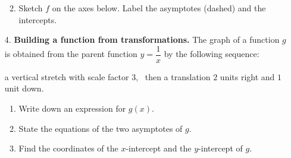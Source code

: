 \documentclass[12pt, twoside]{article}
\begin{document}
\begin{enumerate}[itemsep=0.4cm]
\begin{enumerate}[label=(\alph*), itemsep=0.3cm]
  \vspace{1.8cm}

  \item Sketch $f$ on the axes below. Label the asymptotes (dashed) and the
  intercepts.
\end{enumerate}

\begin{figure}[H]
\begin{center}
\end{center}
\end{figure}

\newpage

\item[4.] \textbf{Building a function from transformations.} The graph of a
function $g$ is obtained from the parent function $y=\dfrac{1}{x}$ by the following
sequence:

\begin{center}
a vertical stretch with scale factor $3$, \ then a translation $2$ units right and
$1$ unit down.
\end{center}

\begin{enumerate}[label=(\alph*), itemsep=0.3cm]
  \item Write down an expression for $g(x)$.

  \vspace{2.0cm}

  \item State the equations of the two asymptotes of $g$.

  \vspace{1.4cm}

  \item Find the coordinates of the $x$-intercept and the $y$-intercept of $g$.


\end{enumerate}
\end{enumerate}
\end{document}
